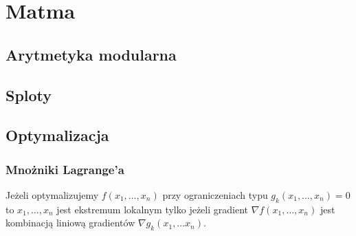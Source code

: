 \section{Matma}

\subsection{Arytmetyka modularna}

\subsection{Sploty}

\subsection{Optymalizacja}
\subsubsection{Mnożniki Lagrange'a}
Jeżeli optymalizujemy $f(x_1, \dots, x_n)$ przy ograniczeniach typu $g_k(x_1, \dots, x_n) = 0$ to
$x_1, \dots, x_n$ jest ekstremum lokalnym tylko jeżeli gradient $\nabla f(x_1, \dots, x_n)$ jest
kombinacją liniową gradientów $\nabla g_k(x_1, \dots x_n)$.
